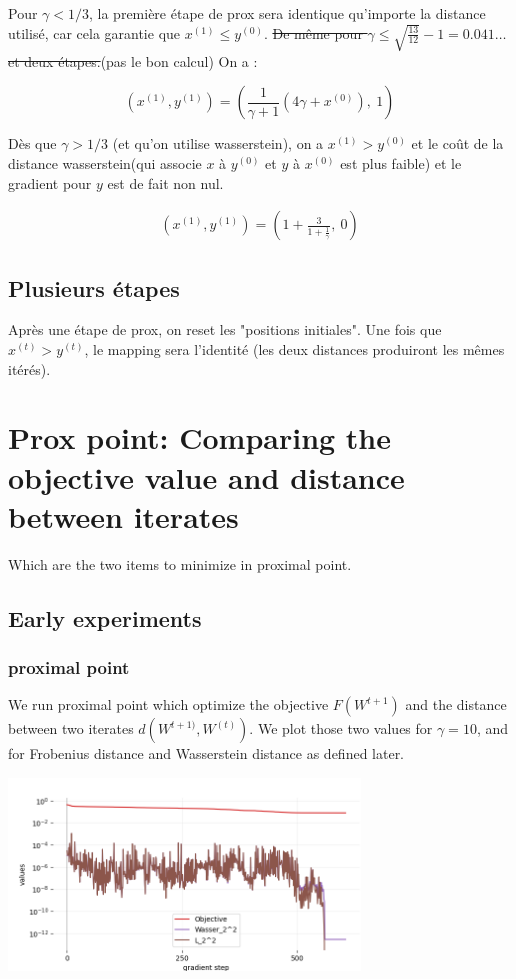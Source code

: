 Pour $\gamma < 1/3$, la première étape de prox sera identique qu'importe la distance utilisé, car cela garantie que $x^{(1)} \leq y^{(0)}$. \sout{De même pour $\gamma \leq \sqrt{\frac{13}{12}} - 1 = 0.041 \dots $ et deux étapes.}(pas le bon calcul) On a :

\begin{equation}
	(x^{(1)}, y^{(1)}) = (\frac{1}{\gamma + 1} \left( 4 \gamma + x^{(0)} \right), \ 1)
\end{equation}

Dès que $\gamma > 1/3$ (et qu'on utilise wasserstein), on a $x^{(1)} > y^{(0)}$ et le coût de la distance wasserstein(qui associe $x$ à $y^{(0)}$ et $y$ à $x^{(0)}$ est plus faible) et le gradient pour $y$ est de fait non nul.

\begin{align}
	(x^{(1)}, y^{(1)}) = (1 + \frac{3}{1+\frac{1}{\gamma}}, \ 0)
\end{align}

\subsection{Plusieurs étapes}

Après une étape de prox, on reset les "positions initiales". Une fois que $x^{(t)}>y^{(t)}$, le mapping sera l'identité (les deux distances produiront les mêmes itérés).

\section{Prox point: Comparing the objective value and distance between iterates}
Which are the two items to minimize in proximal point.
\subsection{Early experiments}
\subsubsection{proximal point}


We run proximal point which optimize the objective $F(W^{t+1})$ and the distance between two iterates $d(W^{t+1)}, W^{(t)})$. We plot those two values for $\gamma=10$, and for Frobenius distance and Wasserstein distance as defined later.

\includegraphics[width=0.7\textwidth]{imgs/tau10_graph_full.png}


